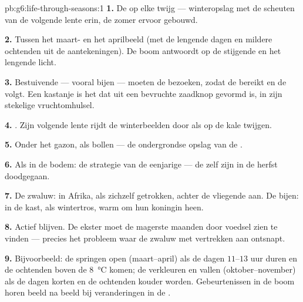 \begin{solution}{pb:g6:life-through-seasons:1}
\textbf{1.} De  op elke twijg --- winteropslag met de scheuten van
de volgende lente erin, de zomer ervoor gebouwd.

\textbf{2.} Tussen het maart- en het aprilbeeld (met de lengende dagen en
mildere ochtenden uit de aantekeningen). De boom antwoordt op de
stijgende  en het lengende licht.

\textbf{3.} Bestuivende  --- vooral bijen --- moeten de 
bezoeken, zodat  de  bereikt en de  volgt.
Een kastanje is het  dat uit een bevruchte zaadknop gevormd is, in
zijn stekelige vruchtomhulsel.

\textbf{4.} . Zijn volgende lente rijdt de winterbeelden
door als  op de kale twijgen.

\textbf{5.} Onder het gazon, als bollen --- de ondergrondse opslag van de
.

\textbf{6.} Als  in de bodem: de strategie van de eenjarige --- de
 zelf zijn in de herfst doodgegaan.

\textbf{7.} De zwaluw: in Afrika, als zichzelf getrokken, achter de
vliegende  aan. De bijen: in de kast, als wintertros, warm om
hun koningin heen.

\textbf{8.} Actief blijven. De ekster moet de magerste maanden door
voedsel zien te vinden --- precies het probleem waar de zwaluw met
vertrekken aan ontsnapt.

\textbf{9.} Bijvoorbeeld: de  springen open (maart--april) als de
dagen $11$--$13$ uur duren en de ochtenden boven de
\qty{8}{\degreeCelsius} komen; de  verkleuren en vallen
(oktober--november) als de dagen korten en de ochtenden kouder worden.
Gebeurtenissen in de boom horen beeld na beeld bij veranderingen in de
.


\end{solution}
